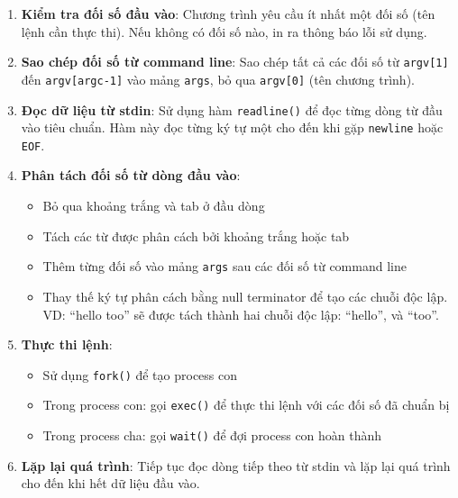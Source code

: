 \begin{enumerate}
    \item \textbf{Kiểm tra đối số đầu vào}: Chương trình yêu cầu ít nhất một đối số (tên lệnh cần thực thi). Nếu không có đối số nào, in ra thông báo lỗi sử dụng.

    \item \textbf{Sao chép đối số từ command line}: Sao chép tất cả các đối số từ \texttt{argv[1]} đến \texttt{argv[argc-1]} vào mảng \texttt{args}, bỏ qua \texttt{argv[0]} (tên chương trình).

    \item \textbf{Đọc dữ liệu từ stdin}: Sử dụng hàm \texttt{readline()} để đọc từng dòng từ đầu vào tiêu chuẩn. Hàm này đọc từng ký tự một cho đến khi gặp \texttt{newline} hoặc \texttt{EOF}.

    \item \textbf{Phân tách đối số từ dòng đầu vào}:
    \begin{itemize}
        \item Bỏ qua khoảng trắng và tab ở đầu dòng
        \item Tách các từ được phân cách bởi khoảng trắng hoặc tab
        \item Thêm từng đối số vào mảng \texttt{args} sau các đối số từ command line
        \item Thay thế ký tự phân cách bằng null terminator để tạo các chuỗi độc lập. VD: ``hello too'' sẽ được tách thành hai chuỗi độc lập: ``hello'', và ``too''.
    \end{itemize}

    \item \textbf{Thực thi lệnh}:
    \begin{itemize}
        \item Sử dụng \texttt{fork()} để tạo process con
        \item Trong process con: gọi \texttt{exec()} để thực thi lệnh với các đối số đã chuẩn bị
        \item Trong process cha: gọi \texttt{wait()} để đợi process con hoàn thành
    \end{itemize}

    \item \textbf{Lặp lại quá trình}: Tiếp tục đọc dòng tiếp theo từ stdin và lặp lại quá trình cho đến khi hết dữ liệu đầu vào.
\end{enumerate}
